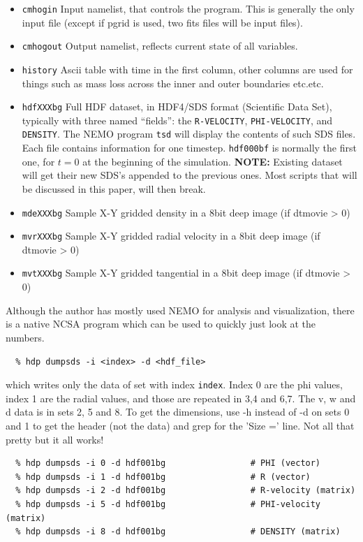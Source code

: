 \documentclass[10pt,dvips]{article}
\begin{document}
\begin{itemize}

\item
{\tt cmhogin}
Input namelist, that controls the program. This is generally
the only input file (except if pgrid is used, two fits files
will be input files).

\item
{\tt cmhogout}
Output namelist, reflects current state of all variables.

\item
{\tt history}
Ascii table with time in the first column, other columns 
are used for things such as mass loss across the inner and 
outer boundaries etc.etc.

\item
{\tt hdfXXXbg}
Full HDF dataset, in HDF4/SDS format (Scientific Data Set), typically
with three named ``fields'': the 
{\tt R-VELOCITY}, {\tt PHI-VELOCITY}, and {\tt DENSITY}.
The NEMO program {\tt tsd} will display the contents of
such SDS files. Each file contains information for one timestep.
{\tt hdf000bf} is normally the first one, for $t=0$ at the beginning
of the simulation.
\newline
{\bf NOTE:} Existing dataset will get their new SDS's appended to
the previous ones. Most scripts that will be discussed in this
paper, will then break. 

\item
{\tt mdeXXXbg}
Sample X-Y gridded density in a 8bit deep image (if dtmovie > 0)

\item
{\tt mvrXXXbg}
Sample X-Y gridded radial velocity in a 8bit deep image (if dtmovie > 0)

\item
{\tt mvtXXXbg}
Sample X-Y gridded tangential in a 8bit deep image (if dtmovie > 0)

\end{itemize}

Although the author has mostly used NEMO for analysis and visualization, 
there is a native NCSA program which can be used to quickly just look
at the numbers.

\begin{verbatim}
  % hdp dumpsds -i <index> -d <hdf_file>
\end{verbatim}
which writes only the data of set with index 
{\tt index}.  Index 0 are the phi
values, index 1 are the radial values, and those are repeated in 3,4 and
6,7.  The v, w and d data is in sets 2, 5 and 8.  To get the dimensions,
use -h instead of -d on sets 0 and 1 to get the header (not the data) and
grep for the 'Size =' line.  Not all that pretty but it all works!
\begin{verbatim}
  % hdp dumpsds -i 0 -d hdf001bg                 # PHI (vector)
  % hdp dumpsds -i 1 -d hdf001bg                 # R (vector)
  % hdp dumpsds -i 2 -d hdf001bg                 # R-velocity (matrix)
  % hdp dumpsds -i 5 -d hdf001bg                 # PHI-velocity (matrix)
  % hdp dumpsds -i 8 -d hdf001bg                 # DENSITY (matrix)
  
\end{verbatim}
\end{document}
